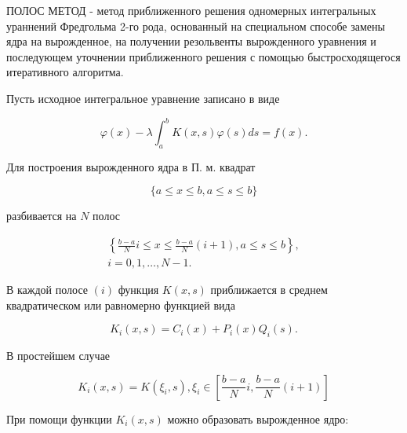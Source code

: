 \documentclass[10pt]{article}
\begin{document}
ПОЛОС МЕТОД - метод приближенного решения одномерных интегральных ураннений Фредгольма 2-го рода, основанный на специальном способе замены ядра на вырожденное, на получении резольвенты вырожденного уравнения и последующем уточнении приближенного решения с помощью быстросходящегося итеративного алгоритма.



Пусть исходное интегральное уравнение записано в виде



\[

\varphi(x)-\lambda \int_{a}^{b} K(x, s) \varphi(s) d s=f(x) .

\]



Для построения вырожденного ядра в П. м. квадрат



\[

\{a \leqslant x \leqslant b, a \leqslant s \leqslant b\}

\]



разбивается на $N$ полос



\[

\begin{gathered}

\left\{\frac{b-a}{N} i \leqslant x \leqslant \frac{b-a}{N}(i+1), a \leqslant s \leqslant b\right\}, \\

i=0,1, \ldots, N-1 .

\end{gathered}

\]



В каждой полосе $(i)$ функция $K(x, s)$ приближается в среднем квадратическом или равномерно функцией вида



\[

K_{i}(x, s)=C_{i}(x)+P_{i}(x) Q_{i}(s) .

\]



В простейшем случае



\[

K_{i}(x, s)=K\left(\xi_{i}, s\right), \xi_{i} \in\left[\frac{b-a}{N} i, \frac{b-a}{N}(i+1)\right]

\]



При помощи функции $K_{i}(x, s)$ можно образовать вырожденное ядро:
\end{document}
